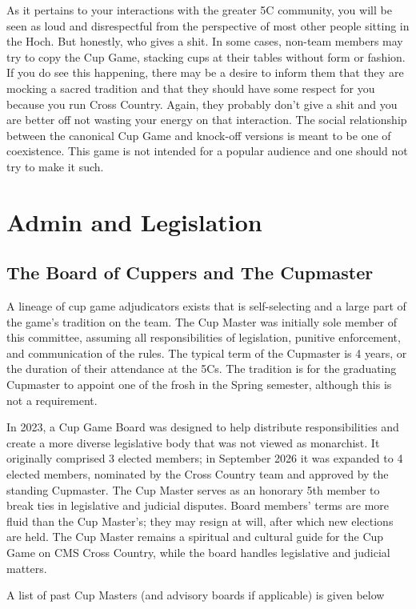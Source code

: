 \documentclass[12pt]{IEEEconf}
\begin{document}
As it pertains to your interactions with the greater 5C community, you will be seen as loud and disrespectful from the perspective of most other people sitting in the Hoch. But honestly, who gives a shit. In some cases, non-team members may try to copy the Cup Game, stacking cups at their tables without form or fashion. If you do see this happening, there may be a desire to inform them that they are mocking a sacred tradition and that they should have some respect for you because you run Cross Country. Again, they probably don't give a shit and you are better off not wasting your energy on that interaction. The social relationship between the canonical Cup Game and knock-off versions is meant to be one of coexistence. This game is not intended for a popular audience and one should not try to make it such.

\section{Admin and Legislation}
\subsection{The Board of Cuppers and The Cupmaster}
A lineage of cup game adjudicators exists that is self-selecting and a large part of the game's tradition on the team. The Cup Master was initially sole member of this committee, assuming all responsibilities of legislation, punitive enforcement, and communication of the rules. The typical term of the Cupmaster is 4 years, or the duration of their attendance at the 5Cs. The tradition is for the graduating Cupmaster to appoint one of the frosh in the Spring semester, although this is not a requirement. 

In 2023, a Cup Game Board was designed to help distribute responsibilities and create a more diverse legislative body that was not viewed as monarchist. It originally comprised 3 elected members; in September 2026 it was expanded to 4 elected members, nominated by the Cross Country team and approved by the standing Cupmaster. The Cup Master serves as an honorary 5th member to break ties in legislative and judicial disputes. Board members' terms are more fluid than the Cup Master's; they may resign at will, after which new elections are held. The Cup Master remains a spiritual and cultural guide for the Cup Game on CMS Cross Country, while the board handles legislative and judicial matters.

A list of past Cup Masters (and advisory boards if applicable) is given below
\end{document}
